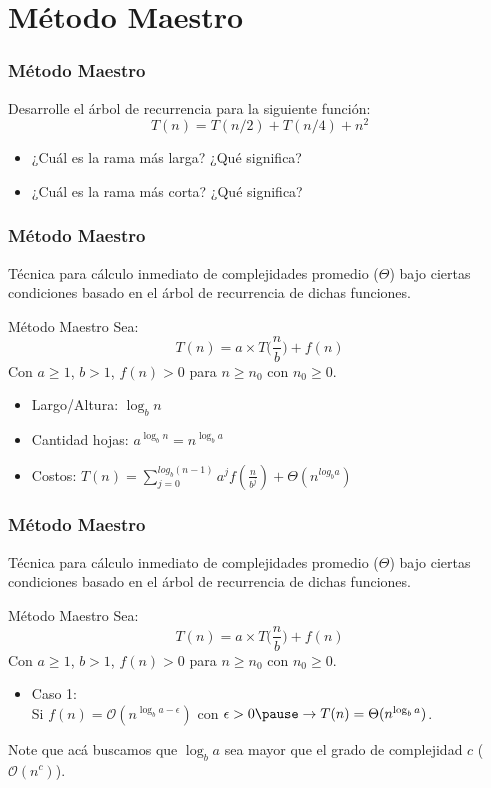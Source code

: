\documentclass{beamer}
\begin{document}
\section{Método Maestro}
\begin{frame}[fragile]
 \frametitle{Método Maestro}
\small
Desarrolle el árbol de recurrencia para la siguiente función:
$$ T(n) = T(n/2) + T(n/4) + n^2 $$

\begin{itemize}
\item ¿Cuál es la rama más larga? ¿Qué significa?
\item ¿Cuál es la rama más corta? ¿Qué significa?
\end{itemize}
\end{frame}

\begin{frame}[fragile]
 \frametitle{Método Maestro}
\small Técnica para cálculo inmediato de complejidades promedio ($\Theta$) bajo ciertas condiciones basado en el árbol de recurrencia de dichas funciones.

\begin{block}{Método Maestro}
Sea: 
$$ T(n) = a \times T\Big(\frac{n}{b}\Big) + f(n) $$
Con $a \geq 1$, $b > 1$, $f(n) > 0 $ para $n \geq n_0$ con $n_0 \geq 0$. 
\end{block}

\begin{itemize}
\item Largo/Altura: $\log_{b} n$
\item Cantidad hojas: $a^{\log_{b} n} = n^{\log_{b} a}$
\item Costos: $T(n) = \sum_{j=0}^{log_{b}(n-1)} a^j f(\frac{n}{b^j}) + \Theta(n^{log_{b}a})$
\end{itemize}
\end{frame}



\begin{frame}[fragile]
 \frametitle{Método Maestro}
\small Técnica para cálculo inmediato de complejidades promedio ($\Theta$) bajo ciertas condiciones basado en el árbol de recurrencia de dichas funciones.

\begin{block}{Método Maestro}
Sea: 
$$ T(n) = a \times T\Big(\frac{n}{b}\Big) + f(n) $$
Con $a \geq 1$, $b > 1$, $f(n) > 0 $ para $n \geq n_0$ con $n_0 \geq 0$. 
\begin{itemize}
\item Caso 1:\\
\smallskip
Si $f(n) = \mathcal{O}(n^{\log_b a - \epsilon})$ con $\epsilon > 0 \pause \rightarrow T(n) = \Theta(n^{\log_b a})$.
\end{itemize}
\end{block}
Note que acá buscamos que $\log_b a$ sea mayor que el grado de complejidad $c$ ($\mathcal{O}(n^c)$). 
\end{frame}
\end{document}

